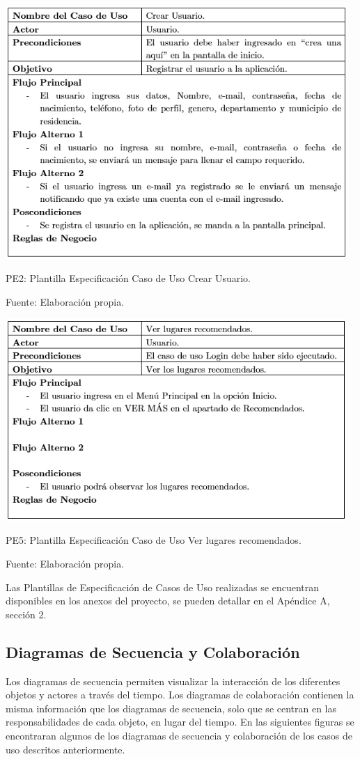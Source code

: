 \documentclass[12pt,letterpaper,openany]{book}
\begin{document}
\begin{table}[H]
\centering
\includegraphics[width=13cm]{./imagenes/PCU/crear_usuario}
\caption{PE2: Plantilla Especificación Caso de Uso Crear Usuario.}
\centering Fuente: Elaboración propia.
\end{table}

\begin{table}[H]
\centering
\includegraphics[width=13cm]{./imagenes/PCU/ver_lugares_recomendados}
\caption{PE5: Plantilla Especificación Caso de Uso Ver lugares recomendados.}
\centering Fuente: Elaboración propia.
\end{table}

Las Plantillas de Especificación de Casos de Uso realizadas se encuentran disponibles en los anexos del proyecto, se pueden detallar en el Apéndice A, sección 2.

\subsection{Diagramas de Secuencia y Colaboración}
Los diagramas de secuencia permiten visualizar la interacción de los diferentes objetos y actores a través del tiempo. Los diagramas de colaboración contienen la misma información que los diagramas de secuencia, solo que se centran en las responsabilidades de cada objeto, en lugar del tiempo. En las siguientes figuras se encontraran algunos de los diagramas de secuencia y colaboración de los casos de uso descritos anteriormente.
\end{document}
